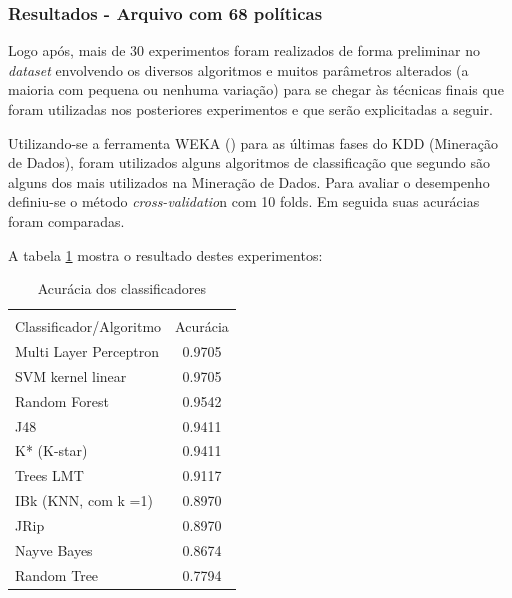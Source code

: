\subsubsection{Resultados - Arquivo com 68 políticas}
Logo após, mais de 30 experimentos foram realizados de forma preliminar no \textit{dataset} envolvendo os diversos algoritmos e muitos parâmetros alterados (a maioria com pequena ou nenhuma variação) para se chegar às técnicas finais que foram utilizadas nos posteriores experimentos e que serão explicitadas a seguir.

Utilizando-se a ferramenta WEKA (\cite{eibe2016}) para as últimas fases do KDD (Mineração de Dados), foram utilizados alguns algoritmos de classificação que segundo \cite{wu2007} são alguns dos mais utilizados na Mineração de Dados. Para avaliar o desempenho definiu-se o método \textit{cross-validatio}n com 10 folds. Em seguida suas acurácias foram comparadas.

A tabela \ref{tab:acuracias} mostra o resultado destes experimentos:

\begin{table}[h!]
	\centering
	\caption{Acurácia dos classificadores}
	\label{tab:acuracias}
	\vspace{0.3cm}
	\begin{tabular}{p{6cm}c}
		\hline\\
		Classificador/Algoritmo& Acurácia  \\[10pt] 
		\hline
		Multi Layer Perceptron & 0.9705    \\
		SVM kernel linear~     & 0.9705    \\
		Random Forest~		   & 0.9542	   \\
		J48                    & 0.9411    \\
		K* (K-star)            & 0.9411    \\
		Trees LMT              & 0.9117    \\
		IBk (KNN, com k =1)~   & 0.8970    \\
		JRip                   & 0.8970    \\		
		Nayve Bayes            & 0.8674    \\
		Random Tree            & 0.7794    \\
		\hline
	\end{tabular}
	\\[6pt]		
\end{table}

